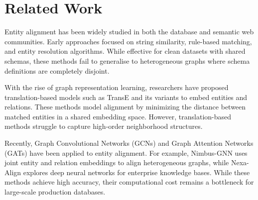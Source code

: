 \section{Related Work}
Entity alignment has been widely studied in both the database and semantic web communities. Early approaches focused on string similarity, rule-based matching, and entity resolution algorithms. While effective for clean datasets with shared schemas, these methods fail to generalise to heterogeneous graphs where schema definitions are completely disjoint.

With the rise of graph representation learning, researchers have proposed translation-based models such as TransE and its variants to embed entities and relations. These methods model alignment by minimizing the distance between matched entities in a shared embedding space. However, translation-based methods struggle to capture high-order neighborhood structures.

Recently, Graph Convolutional Networks (GCNs) and Graph Attention Networks (GATs) have been applied to entity alignment. For example, Nimbus-GNN \cite{nimbus2023framework} uses joint entity and relation embeddings to align heterogeneous graphs, while Nexa-Align \cite{alfihri2022nexa} explores deep neural networks for enterprise knowledge bases. While these methods achieve high accuracy, their computational cost remains a bottleneck for large-scale production databases.
